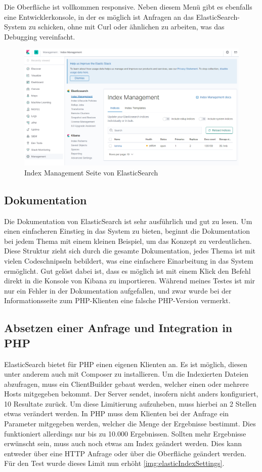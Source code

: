 Die Oberfläche ist vollkommen responsive. Neben diesem Menü gibt es ebenfalls eine Entwicklerkonsole, in der es möglich ist Anfragen an das ElasticSearch-System zu schicken, ohne mit Curl oder ähnlichen zu arbeiten, was das Debugging vereinfacht.

\begin{figure}
	\centering
	\includegraphics[width=1\linewidth]{images/elastic_ui.png}
	\caption{Index Management Seite von ElasticSearch}
	\label{img:elasticInterface}
\end{figure}


\subsection{Dokumentation}

Die Dokumentation von ElasticSearch ist sehr ausführlich und gut zu lesen. Um einen einfacheren Einstieg in das System zu bieten, beginnt die Dokumentation bei jedem Thema mit einem kleinen Beispiel, um das Konzept zu verdeutlichen. Diese Struktur zieht sich durch die gesamte Dokumentation, jedes Thema ist mit vielen Codeschnipseln bebildert, was eine einfachere Einarbeitung in das System ermöglicht. 
Gut gelöst dabei ist, dass es möglich ist mit einem Klick den Befehl direkt in die Konsole von Kibana zu importieren. Während meines Testes ist mir nur ein Fehler in der Dokumentation aufgefallen, und zwar wurde bei der Informationsseite zum PHP-Klienten eine falsche PHP-Version vermerkt.


\subsection{Absetzen einer Anfrage und Integration in PHP}

ElasticSearch bietet für PHP einen eigenen Klienten an. Es ist möglich, diesen unter anderem auch mit Composer zu installieren. Um die Indexierten Dateien abzufragen, muss ein ClientBuilder gebaut werden, welcher einen oder mehrere Hosts mitgegeben bekommt. Der Server sendet, insofern nicht anders konfiguriert, 10 Resultate zurück. Um diese Limitierung aufzuheben, muss hierbei an 2 Stellen etwas verändert werden. In PHP muss dem Klienten bei der Anfrage ein Parameter mitgegeben werden, welcher die Menge der Ergebnisse bestimmt. Dies funktioniert allerdings nur bis zu 10.000 Ergebnissen. Sollten mehr Ergebnisse erwünscht sein, muss auch noch etwas am Index geändert werden. Dies kann entweder über eine HTTP Anfrage oder über die Oberfläche geändert werden. Für den Test wurde dieses Limit nun erhöht \ref{img:elasticIndexSettings}. 



